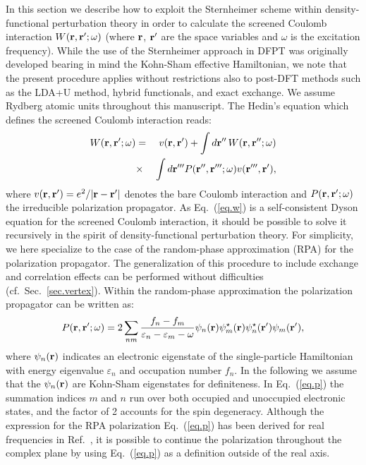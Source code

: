 \documentclass[twocolumn,prb,showpacs,superscriptaddress]{revtex4}
\def\w{\omega}
\def\E{\varepsilon}
\def\r{{\bf r}}
\def\rp{{\bf r^\prime}}
\def\rpp{{\bf r^{\prime\prime}}}
\def\rppp{{\bf r^{\prime\prime\prime}}}
\begin{document}
In this section we describe how to exploit the Sternheimer scheme within density-functional
perturbation theory in order to calculate the screened Coulomb interaction
$W(\r,\rp;\w)$ (where $\r$, $\rp$ are the space variables and $\w$ is the
excitation frequency). While the use of the Sternheimer approach in DFPT 
was originally developed bearing in mind the Kohn-Sham effective Hamiltonian, 
we note that the present procedure applies without restrictions also to 
post-DFT methods such as the LDA+U method,\cite{anisimov} hybrid 
functionals,\cite{becke} and exact exchange.\cite{exx}
We assume Rydberg atomic units throughout this manuscript. 
The Hedin's equation which defines the screened Coulomb 
interaction reads:\cite{hl}
  \begin{eqnarray}\label{eq.w}
  W(\r,\rp;\w) & = & v(\r,\rp) + \int d\rpp \,W(\r,\rpp;\w)  \nonumber \\
   & \times & \int d\rppp P(\rpp,\rppp;\w) v(\rppp,\rp),
  \end{eqnarray}
where $v(\r,\rp)=e^2/|\r-\rp|$ denotes the bare Coulomb interaction and 
$P(\r,\rp;\w)$ the irreducible polarization propagator. 
As Eq.\ (\ref{eq.w}) is a self-consistent Dyson equation for the
screened Coulomb interaction, it should be possible to solve it
recursively in the spirit of density-functional perturbation theory.
For simplicity, we here specialize to the case of the random-phase approximation (RPA)
for the polarization propagator. 
The generalization of this procedure to include exchange and correlation
effects can be performed without difficulties (cf.\ Sec.~\ref{sec.vertex}).
Within the random-phase approximation the polarization propagator can be written as:\cite{hl}
  \begin{equation}\label{eq.p}
  P(\r,\rp;\w) = 2\sum_{n m} \frac{f_n-f_m}{\E_n-\E_m-\w} 
  \psi_n(\r)\psi_m^\star(\r)  \psi_n^\star(\rp)\psi_m(\rp),
  \end{equation}
where $\psi_n(\r)$ indicates an electronic eigenstate of the
single-particle Hamiltonian 
with energy eigenvalue $\E_n$ and occupation number $f_n$. 
In the following we assume that the $\psi_n(\r)$ are Kohn-Sham
eigenstates for definiteness.
In Eq.\ (\ref{eq.p}) the summation indices $m$ and $n$ run over
both occupied and unoccupied electronic states, and the factor of 2 accounts for the
spin degeneracy.\cite{hl}
Although the expression for the RPA polarization Eq.~(\ref{eq.p})
has been derived for real frequencies in Ref.\ , it
is possible to continue the polarization throughout the complex 
plane by using Eq.~(\ref{eq.p}) as a definition outside of the real axis.
\end{document}
